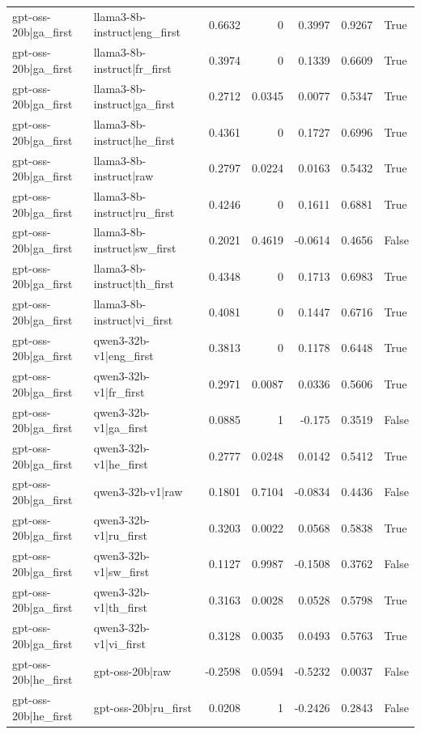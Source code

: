 \begin{table}
\begin{tabular}{l l r r r r l}
gpt-oss-20b|ga_first & llama3-8b-instruct|eng_first & 0.6632 & 0 & 0.3997 & 0.9267 & True \\
gpt-oss-20b|ga_first & llama3-8b-instruct|fr_first & 0.3974 & 0 & 0.1339 & 0.6609 & True \\
gpt-oss-20b|ga_first & llama3-8b-instruct|ga_first & 0.2712 & 0.0345 & 0.0077 & 0.5347 & True \\
gpt-oss-20b|ga_first & llama3-8b-instruct|he_first & 0.4361 & 0 & 0.1727 & 0.6996 & True \\
gpt-oss-20b|ga_first & llama3-8b-instruct|raw & 0.2797 & 0.0224 & 0.0163 & 0.5432 & True \\
gpt-oss-20b|ga_first & llama3-8b-instruct|ru_first & 0.4246 & 0 & 0.1611 & 0.6881 & True \\
gpt-oss-20b|ga_first & llama3-8b-instruct|sw_first & 0.2021 & 0.4619 & -0.0614 & 0.4656 & False \\
gpt-oss-20b|ga_first & llama3-8b-instruct|th_first & 0.4348 & 0 & 0.1713 & 0.6983 & True \\
gpt-oss-20b|ga_first & llama3-8b-instruct|vi_first & 0.4081 & 0 & 0.1447 & 0.6716 & True \\
gpt-oss-20b|ga_first & qwen3-32b-v1|eng_first & 0.3813 & 0 & 0.1178 & 0.6448 & True \\
gpt-oss-20b|ga_first & qwen3-32b-v1|fr_first & 0.2971 & 0.0087 & 0.0336 & 0.5606 & True \\
gpt-oss-20b|ga_first & qwen3-32b-v1|ga_first & 0.0885 & 1 & -0.175 & 0.3519 & False \\
gpt-oss-20b|ga_first & qwen3-32b-v1|he_first & 0.2777 & 0.0248 & 0.0142 & 0.5412 & True \\
gpt-oss-20b|ga_first & qwen3-32b-v1|raw & 0.1801 & 0.7104 & -0.0834 & 0.4436 & False \\
gpt-oss-20b|ga_first & qwen3-32b-v1|ru_first & 0.3203 & 0.0022 & 0.0568 & 0.5838 & True \\
gpt-oss-20b|ga_first & qwen3-32b-v1|sw_first & 0.1127 & 0.9987 & -0.1508 & 0.3762 & False \\
gpt-oss-20b|ga_first & qwen3-32b-v1|th_first & 0.3163 & 0.0028 & 0.0528 & 0.5798 & True \\
gpt-oss-20b|ga_first & qwen3-32b-v1|vi_first & 0.3128 & 0.0035 & 0.0493 & 0.5763 & True \\
gpt-oss-20b|he_first & gpt-oss-20b|raw & -0.2598 & 0.0594 & -0.5232 & 0.0037 & False \\
gpt-oss-20b|he_first & gpt-oss-20b|ru_first & 0.0208 & 1 & -0.2426 & 0.2843 & False \\

\end{tabular}
\end{table}
